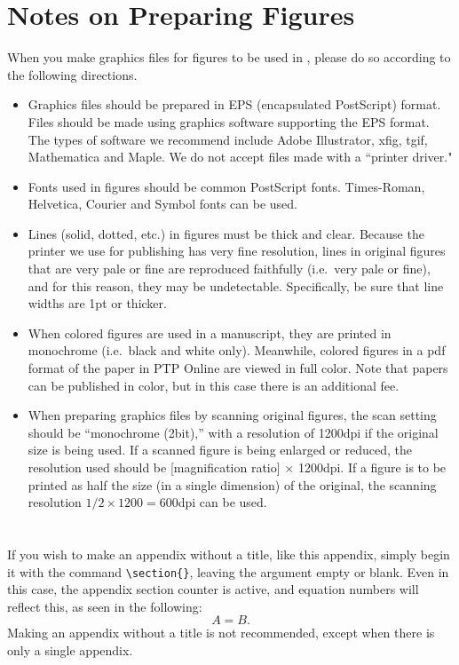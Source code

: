 \documentclass[seceq]{ptptex}
\begin{document}
\section{Notes on Preparing Figures}
When you make graphics files for figures to be used in \PTPTeX, 
please do so according to the following directions.
\begin{itemize}
\item Graphics files should be prepared in EPS (encapsulated
PostScript) format.
Files should be made using graphics software supporting the EPS format.
The types of software we recommend include Adobe Illustrator, xfig, 
tgif, Mathematica and Maple.
We do not accept files made with a ``printer driver."
\item Fonts used in figures should be common PostScript fonts.
Times-Roman, Helvetica, Courier and Symbol fonts can be used.
\item Lines (solid, dotted, etc.) in figures must be thick and clear.
Because the printer we use for publishing has very fine resolution, 
lines in original figures that are very pale or fine are reproduced 
faithfully (i.e.~very pale or fine), and for this reason, they may be
undetectable.
Specifically, be sure that line widths are 1pt or thicker.
\item When colored figures are used in a manuscript, they are printed
in monochrome (i.e.~black and white only). Meanwhile, 
colored figures in a pdf format of the paper in PTP Online are viewed
in full color. 
Note that papers can be published in color, but in this case there 
is an additional fee.
\item When preparing graphics files by scanning original figures, the
scan setting should be ``monochrome (2bit),'' with a resolution of 
1200dpi if the original size is being used.
If a scanned figure is being enlarged or reduced, the resolution used 
should be [magnification ratio] $\times$ 1200dpi.
If a figure is to be printed as half the size (in a single dimension) 
of the original, the scanning resolution $1/2 \times 1200 = 600$dpi 
can be used.
\end{itemize}

\section{ }
If you wish to make an appendix without a title, like this appendix, 
simply begin it with the command \verb+\section{}+, leaving the 
argument empty or blank. Even in this case, the 
appendix section counter is active, and equation numbers will reflect 
this, as seen in the following:
\begin{equation}
A=B.
\end{equation}
Making an appendix without a title is not recommended, except when 
there is only a single appendix.
\end{document}
